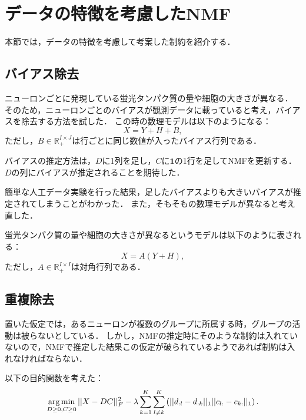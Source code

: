 \section{データの特徴を考慮したNMF}
本節では，データの特徴を考慮して考案した制約を紹介する．

\subsection{バイアス除去}
ニューロンごとに発現している蛍光タンパク質の量や細胞の大きさが異なる．
そのため，ニューロンごとのバイアスが観測データに載っていると考え，バイアスを除去する方法を試した．
この時の数理モデルは以下のようになる：
\begin{equation}
	X = Y + H + B,
\end{equation}
ただし，$B \in \mathbb{R}_+^{I\times J}$は行ごとに同じ数値が入ったバイアス行列である．

バイアスの推定方法は，$D$に1列を足し，$C$に$\mathbf 1$の1行を足してNMFを更新する．
$D$の列にバイアスが推定されることを期待した．

簡単な人工データ実験を行った結果，足したバイアスよりも大きいバイアスが推定されてしまうことがわかった．
また，そもそもの数理モデルが異なると考え直した．

蛍光タンパク質の量や細胞の大きさが異なるというモデルは以下のように表される：
\begin{equation}
	X = A(Y + H),
\end{equation}
ただし，$A \in \mathbb{R}_+^{I \times I}$は対角行列である．

\subsection{重複除去}
置いた仮定では，あるニューロンが複数のグループに所属する時，グループの活動は被らないとしている．
しかし，NMFの推定時にそのような制約は入れていないので，NMFで推定した結果この仮定が破られているようであれば制約は入れなければならない．

以下の目的関数を考えた：
\begin{eqnarray}
	\operatorname*{arg\,min}_{D \geq 0, C \geq 0} ||X - DC||_F^2 - \lambda \sum_{k=1}^K \sum_{l \neq k}^K \left( || d_{:l} - d_{:k} ||_1 || c_{l:} - c_{k:} ||_1 \right).
  \label{eq:overlap}
\end{eqnarray}

